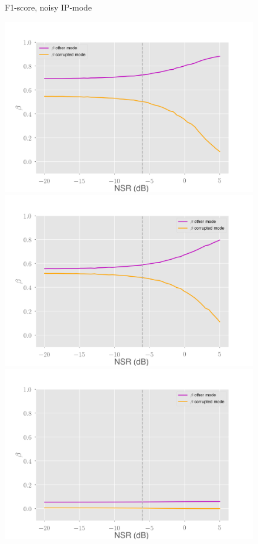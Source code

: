 \documentclass[10pt]{beamer}
\begin{document}
\begin{frame}
\begin{multicols}{2}
\begin{figure}
\begin{overprint}
\end{overprint}
\caption{F1-score, noisy IP-mode}
\end{figure}
\columnbreak
\begin{figure}
\centering
\begin{overprint}
    \includegraphics[scale=0.2]{figs/no-capacity-dm-noisy-beta}
    \includegraphics[scale=0.2]{figs/normal-dm-noisy-beta}
    \includegraphics[scale=0.2]{figs/high-capacity-dm-noisy-beta}

\end{overprint}
\end{figure}
\end{multicols}
\end{frame}
\end{document}
